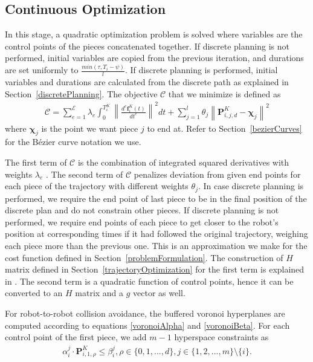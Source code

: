 \documentclass{svproc}
\newcommand{\vP}{\mathbf{P}}
\newcommand{\vf}{\mathbf{f}}
\newcommand{\vchi}{\mathbf{\chi}}
\newcommand{\cC}{\mathcal{C}}
\newcommand{\cE}{\mathcal{E}}
\begin{document}

\subsection{Continuous Optimization}\label{continuousOptimization}
In this stage, a quadratic optimization problem is solved where variables are the control points of the pieces concatenated together. If discrete planning is not performed, initial variables are copied from the previous iteration, and durations are set uniformly to $\frac{min(\tau,T_i-\psi)}{l}$. If discrete planning is performed, initial variables and durations are calculated from the discrete path as explained in Section~\ref{discretePlanning}. The objective $\cC$ that we minimize is defined as
\begin{align}
    \cC = \sum_{e=1}^{\cE} \lambda_e\int_{0}^{T^K_i} \left\|\frac{d^e\vf^{K}_i(t)}{dt^e}\right\|^2dt + \sum_{j=1}^{l} \theta_j \left\|\vP^{K}_{i,j,d} - \vchi_{j}\right\|^2 \label{costFunction}
\end{align}
where $\vchi_j$ is the point we want piece $j$ to end at. Refer to Section~\ref{bezierCurves} for the B\'ezier curve notation we use.

The first term of $\cC$ is the combination of integrated squared derivatives with weights $\lambda_e$ \cite{crazyplanning-ieeetro,richterISRR}. The second term of $\cC$ penalizes deviation from given end points for each piece of the trajectory with different weights $\theta_j$. In case discrete planning is performed, we require the end point of last piece to be in the final position of the discrete plan and do not constrain other pieces. If discrete planning is not performed, we require end points of each piece to get closer to the robot's position at corresponding times if it had followed the original trajectory, weighing each piece more than the previous one. This is an approximation we make for the cost function defined in Section~\ref{problemFormulation}. The construction of $H$ matrix defined in Section~\ref{trajectoryOptimization} for the first term is explained in \cite{crazyplanning-ieeetro}. The second term is a quadratic function of control points, hence it can be converted to an $H$ matrix and a $g$ vector as well.

For robot-to-robot collision avoidance, the buffered voronoi hyperplanes are computed according to equations \eqref{voronoiAlpha} and \eqref{voronoiBeta}. For each control point of the first piece, we add $m-1$ hyperspace constraints as
\begin{align}
    \alpha_i^j \cdot \vP^{K}_{i,1,\rho} \leq \beta_i^j, \rho \in \{0,1,...,d\}, j \in \{1,2,...,m\}\setminus\{i\}.
\end{align}
\end{document}
